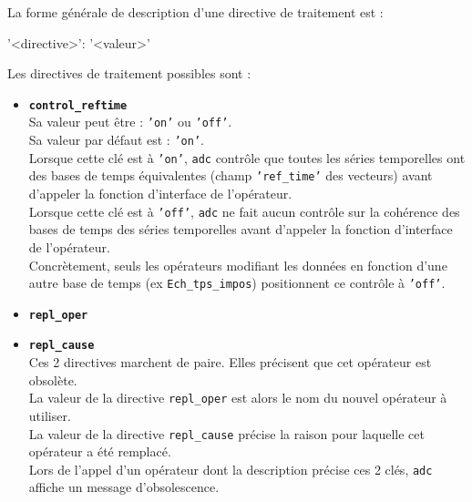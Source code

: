 La forme générale de description d'une directive de traitement est :
  \medbreak

  \begin{boxedverbatim}
    '<directive>': '<valeur>'
  \end{boxedverbatim}
  \medbreak

  Les directives de traitement possibles sont :
  \begin{itemize}
    \item[•] \textbf{\texttt{control\_reftime}} \\
             Sa valeur peut être : \texttt{'on'} ou \texttt{'off'}. \\
             Sa valeur par défaut est : \texttt{'on'}. \\
             Lorsque cette clé est à \texttt{'on'}, \texttt{adc} contrôle que
             toutes les séries temporelles ont des bases de temps équivalentes
             (champ \texttt{'ref\_time'} des vecteurs) avant d'appeler la
             fonction d'interface de l'opérateur. \\

             Lorsque cette clé est à \texttt{'off'}, \texttt{adc} ne fait aucun
             contrôle sur la cohérence des bases de temps des séries
             temporelles avant d'appeler la fonction d'interface de l'opérateur. \\

             Concrètement, seuls les opérateurs modifiant les données en
             fonction d'une autre base de temps (ex \texttt{Ech\_tps\_impos})
             positionnent ce contrôle à \texttt{'off'}. \\

    \item[•] \textbf{\texttt{repl\_oper}}
    \item[•] \textbf{\texttt{repl\_cause}} \\
             Ces 2 directives marchent de paire. Elles précisent que cet
             opérateur est obsolète. \\

             La valeur de la directive \texttt{repl\_oper} est alors le nom du
             nouvel opérateur à utiliser. \\

             La valeur de la directive \texttt{repl\_cause} précise la raison
             pour laquelle cet opérateur a été remplacé. \\

             Lors de l'appel d'un opérateur dont la description précise ces
             2 clés, \texttt{adc} affiche un message d'obsolescence. \\


\end{itemize}
